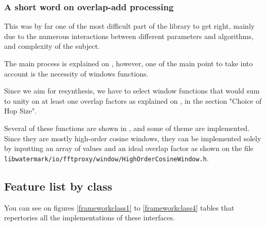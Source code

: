 \subsubsection{A short word on overlap-add processing}
This was by far one of the most difficult part of the library to get right, mainly due to the numerous interactions between different parameters and algorithms, and complexity of the subject.

The main process is explained on \cite{overlap}, however, one of the main point to take into account is the necessity of windows functions.

Since we aim for resynthesis, we have to select window functions that would sum to unity on at least one overlap factors as explained on \cite{smith1987parshl}, in the section "Choice of Hop Size". 

Several of these functions are shown in \cite{heinzel2002spectrum}, and some of theme are implemented. Since they are mostly high-order cosine windows, they can be implemented solely by inputting an array of values and an ideal overlap factor as shown on the file \texttt{libwatermark/io/fftproxy/window/HighOrderCosineWindow.h}.
\subsection{Feature list by class}
You can see on figures \ref{frameworkclass1} to \ref{frameworkclass4} tables that repertories all the implementations of these interfaces.

